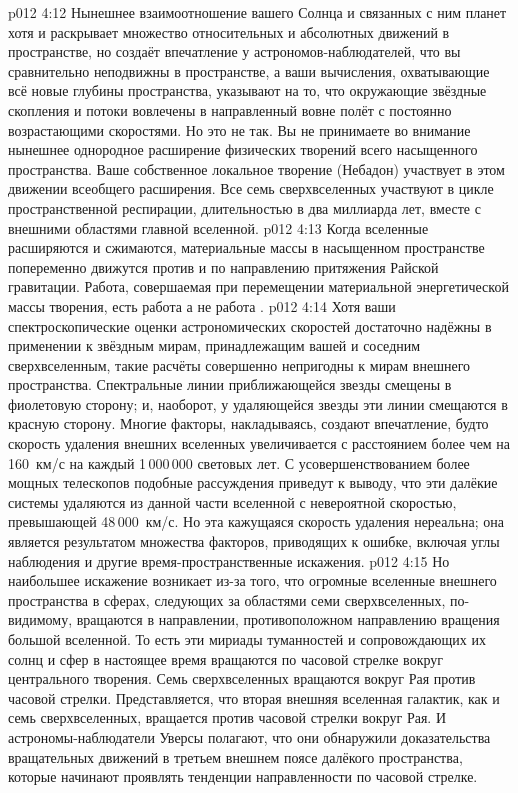 \vs p012 4:12 \pc Нынешнее взаимоотношение вашего Солнца и связанных с ним планет хотя и раскрывает множество относительных и абсолютных движений в пространстве, но создаёт впечатление у астрономов\hyp{}наблюдателей, что вы сравнительно неподвижны в пространстве, а ваши вычисления, охватывающие всё новые глубины пространства, указывают на то, что окружающие звёздные скопления и потоки вовлечены в направленный вовне полёт с постоянно возрастающими скоростями. Но это не так. Вы не принимаете во внимание нынешнее однородное расширение физических творений всего насыщенного пространства. Ваше собственное локальное творение (Небадон) участвует в этом движении всеобщего расширения. Все семь сверхвселенных участвуют в цикле пространственной респирации, длительностью в два миллиарда лет, вместе с внешними областями главной вселенной.
\vs p012 4:13 Когда вселенные расширяются и сжимаются, материальные массы в насыщенном пространстве попеременно движутся против и по направлению притяжения Райской гравитации. Работа, совершаемая при перемещении материальной энергетической массы творения, есть работа  а не работа .
\vs p012 4:14 \pc Хотя ваши спектроскопические оценки астрономических скоростей достаточно надёжны в применении к звёздным мирам, принадлежащим вашей и соседним сверхвселенным, такие расчёты совершенно непригодны к мирам внешнего пространства. Спектральные линии приближающейся звезды смещены в фиолетовую сторону; и, наоборот, у удаляющейся звезды эти линии смещаются в красную сторону. Многие факторы, накладываясь, создают впечатление, будто скорость удаления внешних вселенных увеличивается с расстоянием более чем на 160~км/с на каждый 1\,000\,000 световых лет. С усовершенствованием более мощных телескопов подобные рассуждения приведут к выводу, что эти далёкие системы удаляются из данной части вселенной с невероятной скоростью, превышающей 48\,000~км/с. Но эта кажущаяся скорость удаления нереальна; она является результатом множества факторов, приводящих к ошибке, включая углы наблюдения и другие время\hyp{}пространственные искажения.
\vs p012 4:15 Но наибольшее искажение возникает из\hyp{}за того, что огромные вселенные внешнего пространства в сферах, следующих за областями семи сверхвселенных, по\hyp{}видимому, вращаются в направлении, противоположном направлению вращения большой вселенной. То есть эти мириады туманностей и сопровождающих их солнц и сфер в настоящее время вращаются по часовой стрелке вокруг центрального творения. Семь сверхвселенных вращаются вокруг Рая против часовой стрелки. Представляется, что вторая внешняя вселенная галактик, как и семь сверхвселенных, вращается против часовой стрелки вокруг Рая. И астрономы\hyp{}наблюдатели Уверсы полагают, что они обнаружили доказательства вращательных движений в третьем внешнем поясе далёкого пространства, которые начинают проявлять тенденции направленности по часовой стрелке.
